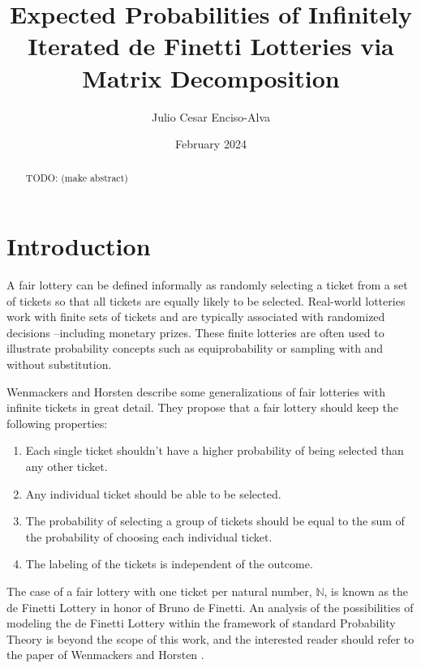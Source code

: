 \documentclass{article}
\title{Expected Probabilities of Infinitely Iterated de Finetti Lotteries via Matrix Decomposition}
\author{Julio Cesar Enciso-Alva}
\date{February 2024}
\newcommand{\N}{\mathbb{N}}
\begin{document}

\maketitle

\begin{abstract}
    TODO: (make abstract)
\end{abstract}


\section{Introduction}

A fair lottery can be defined informally as randomly selecting a ticket from a set of tickets so that all tickets are equally likely to be selected. 
%
Real-world lotteries work with finite sets of tickets and are typically associated with randomized decisions --including monetary prizes. 
%
These finite lotteries are often used to illustrate probability concepts such as equiprobability or sampling with and without substitution.

Wenmackers and Horsten \cite{fair_infinite_lottery} describe some generalizations of fair lotteries with infinite tickets in great detail.
%
They propose that a fair lottery should keep the following properties:
\begin{enumerate}
    \item Each single ticket shouldn't have a higher probability of being selected than any other ticket.
    \item Any individual ticket should be able to be selected.
    \item The probability of selecting a group of tickets should be equal to the sum of the probability of choosing each individual ticket.
    \item The labeling of the tickets is independent of the outcome.
\end{enumerate}

The case of a fair lottery with one ticket per natural number, $\N$, is known as the de Finetti Lottery in honor of Bruno de Finetti.
%
An analysis of the possibilities of modeling the de Finetti Lottery within the framework of standard Probability Theory is beyond the scope of this work, and the interested reader should refer to the paper of Wenmackers and Horsten \cite{fair_infinite_lottery}.
\end{document}
